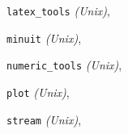 \documentclass[a4paper,10pt,english]{sphinxmanual}
\begin{document}
\begin{theindex}
\indexspace
{}
\item {\texttt{latex\_tools}} \emph{(Unix)}, \pageref{index:module-latex_tools}
\indexspace
{}
\item {\texttt{minuit}} \emph{(Unix)}, \pageref{index:module-minuit}
\indexspace
{}
\item {\texttt{numeric\_tools}} \emph{(Unix)}, \pageref{index:module-numeric_tools}
\indexspace
{}
\item {\texttt{plot}} \emph{(Unix)}, \pageref{index:module-plot}
\indexspace
{}
\item {\texttt{stream}} \emph{(Unix)}, \pageref{index:module-stream}
\end{theindex}

\renewcommand{\indexname}{Index}
\printindex
\end{document}
